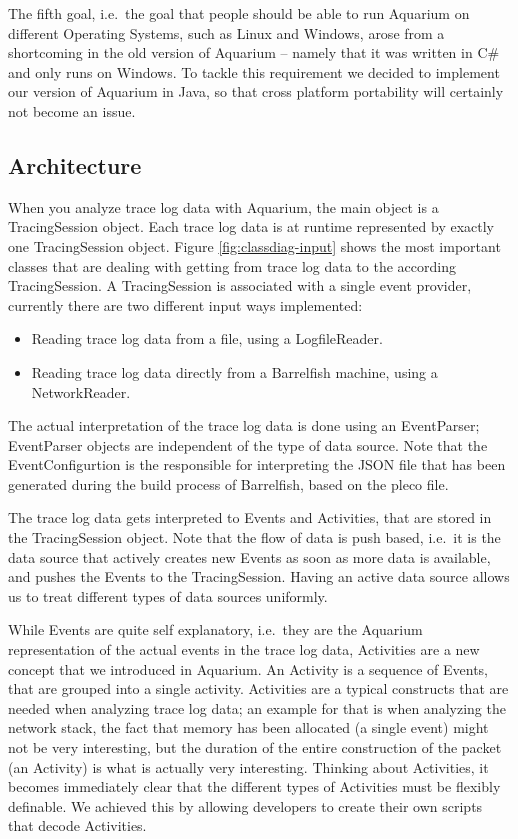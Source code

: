 \documentclass[a4paper,11pt,twoside]{report}
\begin{document}
The fifth goal, i.e.~the goal that people should be able to run Aquarium on
different Operating Systems, such as Linux and Windows, arose from a shortcoming
in the old version of Aquarium -- namely that it was written in C\# and only
runs on Windows. To tackle this requirement we decided to implement our version
of Aquarium in Java, so that cross platform portability will certainly not
become an issue.

\subsection{Architecture\label{sec:aquarium-architecture}}

When you analyze trace log data with Aquarium, the main object is a
TracingSession object. Each trace log data is at runtime represented by exactly
one TracingSession object. Figure \ref{fig:classdiag-input} shows the most
important classes that are dealing with getting from trace log data to the
according TracingSession. A TracingSession is associated with a single event
provider, currently there are two different input ways implemented:

\begin{itemize}
	\item Reading trace log data from a file, using a LogfileReader.
	\item Reading trace log data directly from a Barrelfish machine, using a
		NetworkReader.
\end{itemize}

The actual interpretation of the trace log data is done using an EventParser;
EventParser objects are independent of the type of data source. Note that the
EventConfigurtion is the responsible for interpreting the JSON file that has
been generated during the build process of Barrelfish, based on the pleco file.

The trace log data gets interpreted to Events and Activities, that are stored in
the TracingSession object. Note that the flow of data is push based, i.e.~it is
the data source that actively creates new Events as soon as more data is
available, and pushes the Events to the TracingSession. Having an active data
source allows us to treat different types of data sources uniformly.

While Events are quite self explanatory, i.e.~they are the Aquarium
representation of the actual events in the trace log data, Activities are a new
concept that we introduced in Aquarium. An Activity is a sequence of Events,
that are grouped into a single activity. Activities are a typical constructs
that are needed when analyzing trace log data; an example for that is when
analyzing the network stack, the fact that memory has been allocated (a single
event) might not be very interesting, but the duration of the entire
construction of the packet (an Activity) is what is actually very interesting.
Thinking about Activities, it becomes immediately clear that the different types
of Activities must be flexibly definable. We achieved this by allowing
developers to create their own scripts that decode Activities.
\end{document}
